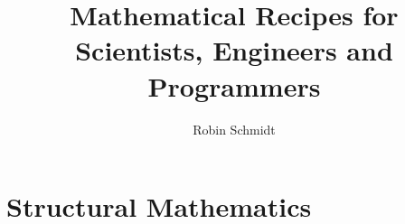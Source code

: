 


	
\parindent=0in
\parskip=0pt
		
 \setcounter{page}{1}

\author{Robin Schmidt}

\title{Mathematical Recipes for Scientists, Engineers and Programmers}
\maketitle

%
%

%
%


\part{Structural Mathematics}   %
% 
%
%

%
% 
 
 
% 


% 





